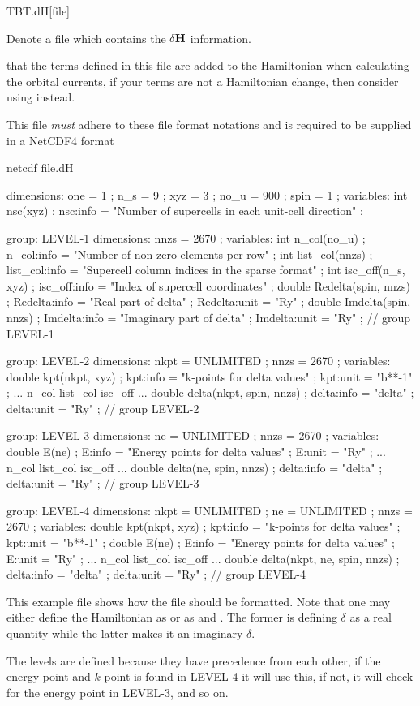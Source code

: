 \begin{fdfentry}{TBT.dH}[file]

  Denote a file which contains the $\delta\mathbf H$ information.

  \note that the terms defined in this file are added to the
  Hamiltonian when calculating the orbital currents, if your terms are
  not a Hamiltonian change, then consider using  instead.

  This file
  \emph{must} adhere to these file format notations and is required to
  be supplied in a NetCDF4 format

  \begin{shellexample}
netcdf file.dH {
dimensions:
	one = 1 ;
	n_s = 9 ;
	xyz = 3 ;
	no_u = 900 ;
	spin = 1 ;
variables:
	int nsc(xyz) ;
		nsc:info = "Number of supercells in each unit-cell direction" ;

group: LEVEL-1 {
  dimensions:
  	nnzs = 2670 ;
  variables:
  	int n_col(no_u) ;
  		n_col:info = "Number of non-zero elements per row" ;
  	int list_col(nnzs) ;
  		list_col:info = "Supercell column indices in the sparse format" ;
  	int isc_off(n_s, xyz) ;
  		isc_off:info = "Index of supercell coordinates" ;
  	double Redelta(spin, nnzs) ;
  		Redelta:info = "Real part of delta" ;
  		Redelta:unit = "Ry" ;
  	double Imdelta(spin, nnzs) ;
  		Imdelta:info = "Imaginary part of delta" ;
  		Imdelta:unit = "Ry" ;
  } // group LEVEL-1

group: LEVEL-2 {
  dimensions:
  	nkpt = UNLIMITED ;
  	nnzs = 2670 ;
  variables:
  	double kpt(nkpt, xyz) ;
  		kpt:info = "k-points for delta values" ;
  		kpt:unit = "b**-1" ;
  	... n_col list_col isc_off ...
  	double delta(nkpt, spin, nnzs) ;
  		delta:info = "delta" ;
  		delta:unit = "Ry" ;
  } // group LEVEL-2

group: LEVEL-3 {
  dimensions:
  	ne = UNLIMITED ;
  	nnzs = 2670 ;
  variables:
  	double E(ne) ;
  		E:info = "Energy points for delta values" ;
  		E:unit = "Ry" ;
  	... n_col list_col isc_off ...
  	double delta(ne, spin, nnzs) ;
  		delta:info = "delta" ;
  		delta:unit = "Ry" ;
  } // group LEVEL-3

group: LEVEL-4 {
  dimensions:
  	nkpt = UNLIMITED ;
  	ne = UNLIMITED ;
  	nnzs = 2670 ;
  variables:
  	double kpt(nkpt, xyz) ;
  		kpt:info = "k-points for delta values" ;
  		kpt:unit = "b**-1" ;
  	double E(ne) ;
  		E:info = "Energy points for delta values" ;
  		E:unit = "Ry" ;
  	... n_col list_col isc_off ...
  	double delta(nkpt, ne, spin, nnzs) ;
  		delta:info = "delta" ;
  		delta:unit = "Ry" ;
  } // group LEVEL-4
}
  \end{shellexample}

  This example file shows how the file should be formatted. Note that
  one may either define the Hamiltonian as  or as
   and . The former is defining $\delta$
  as a real quantity while the latter makes it an imaginary $\delta$.

  The levels are defined because they have precedence from each other,
  if the energy point and $k$ point is found in LEVEL-4 it will use
  this, if not, it will check for the energy point in LEVEL-3, and so
  on. 

\end{fdfentry}

